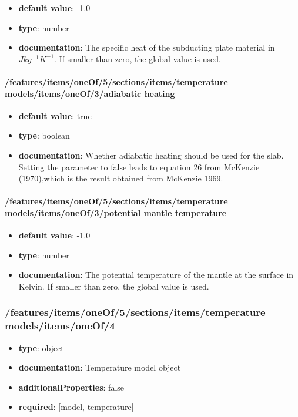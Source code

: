\begin{itemize}\item {\bf default value}: -1.0
\item {\bf type}: number
\item {\bf documentation}: The specific heat of the subducting plate material in $J kg^{-1} K^{-1}$. If smaller than zero, the global value is used.
\end{itemize}\paragraph{/features/items/oneOf/5/sections/items/temperature models/items/oneOf/3/adiabatic heating}
\begin{itemize}\item {\bf default value}: true
\item {\bf type}: boolean
\item {\bf documentation}: Whether adiabatic heating should be used for the slab. Setting the parameter to false leads to equation 26 from McKenzie (1970),which is the result obtained from McKenzie 1969.
\end{itemize}\paragraph{/features/items/oneOf/5/sections/items/temperature models/items/oneOf/3/potential mantle temperature}
\begin{itemize}\item {\bf default value}: -1.0
\item {\bf type}: number
\item {\bf documentation}: The potential temperature of the mantle at the surface in Kelvin. If smaller than zero, the global value is used.
\end{itemize}\subsubsection{/features/items/oneOf/5/sections/items/temperature models/items/oneOf/4}
\begin{itemize}\item {\bf type}: object
\item {\bf documentation}: Temperature model object
\item {\bf additionalProperties}: false
\item {\bf required}: [model, temperature]\end{itemize}
